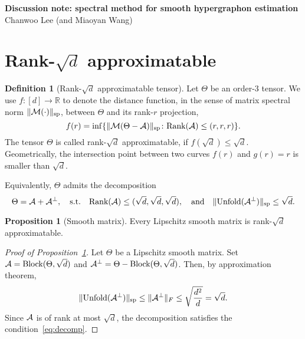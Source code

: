 \documentclass[10pt]{article}
\theoremstyle{definition}
\newtheorem{prop}{Proposition}
\theoremstyle{definition}
\newtheorem{defn}{Definition}
\theoremstyle{definition}
\begin{document}
\begin{center}
{\bf \large Discussion note: spectral method for smooth hypergraphon estimation}\\
{Chanwoo Lee (and Miaoyan Wang)}\\
\end{center}
\section{Rank-$\sqrt{d}$ approximatable}
\begin{defn}[Rank-$\sqrt{d}$ approximatable tensor]\label{ass} Let $\Theta$ be an order-3 tensor.  We use $f\colon[d]\to\mathbb{R}$ to denote the distance function, in the sense of matrix spectral norm $\lVert\mathcal{M}(\cdot)\rVert_\text{sp}$, between $\Theta$ and its rank-$r$ projection,
\[
f(r)=\inf\{\lVert\mathcal{M}(\Theta-\mathcal{A})\rVert_\text{sp}\colon  \text{Rank}(\mathcal{A})\leq (r,r,r)\}.
\]
The tensor $\Theta$ is called rank-$\sqrt{d}$ approximatable, if $f(\sqrt{d})\leq \sqrt{d}$. Geometrically, the intersection point between two curves $f(r)$ and $g(r)=r$ is smaller than $\sqrt{d}$.

Equivalently, $\Theta$ admits the decomposition
\begin{equation}\label{eq:decomp}
\Theta=\mathcal{A}+\mathcal{A}^{\perp},\quad \text{s.t.}\quad \text{Rank}(\mathcal{A})\leq (\sqrt{d},\sqrt{d},\sqrt{d}),\quad \text{and}\quad \lVert\text{Unfold}(\mathcal{A}^{\perp})\rVert_\text{sp}\leq \sqrt{d}.
\end{equation}
\end{defn}
\begin{prop}[Smooth matrix]\label{prop}Every Lipschitz smooth matrix is rank-$\sqrt{d}$ approximatable. 
\end{prop}
\begin{proof}[Proof of Proposition~\ref{prop}] Let $\Theta$ be a Lipschitz smooth matrix. Set $\mathcal{A}=\text{Block}(\Theta,\sqrt{d})$ and $\mathcal{A}^{\perp}=\Theta-\text{Block}(\Theta,\sqrt{d})$. Then, by approximation theorem, 
\[
\lVert\text{Unfold}(\mathcal{A}^{\perp})\rVert_\text{sp}\leq \lVert\mathcal{A}^{\perp}\rVert_F\leq \sqrt{d^2\over d}=\sqrt{d}.
\]
Since $\mathcal{A}$ is of rank at most $\sqrt{d}$, the decomposition satisfies the condition~\eqref{eq:decomp}.
\end{proof}
\end{document}
